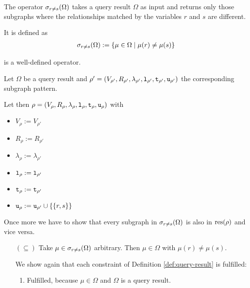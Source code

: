 \begin{definition}
\label{def:distinct}

The  operator $\sigma_{r \not = s}(\Omega)$ takes a query
result $\Omega$ as input and returns only those subgraphs where the
relationships matched by the variables $r$ and $s$ are different.

It is defined as
\begin{align*}
  \sigma_{r \not = s}(\Omega) := \{ \mu \in \Omega \mid \mu(r) \not = \mu(s) \}
\end{align*}

\begin{proofof}{ is a well-defined operator.}
\label{proof:distinct-well-defined}

Let $\Omega$ be a query result and
$\rho' = (V_{\rho'}, R_{\rho'}, \lambda_{\rho'}, \texttt{l}_{\rho'}, \texttt{t}_{\rho'}, \texttt{u}_{\rho'})$
the corresponding subgraph pattern.

Let then $\rho = (V_\rho, R_\rho, \lambda_\rho, \texttt{l}_\rho, \texttt{t}_\rho, \texttt{u}_\rho)$
with
\begin{itemize}[label={}]
  \item $V_\rho := V_{\rho'}$
  \item $R_\rho := R_{\rho'}$
  \item $\lambda_\rho := \lambda_{\rho'}$
  \item $\texttt{l}_\rho := \texttt{l}_{\rho'}$
  \item $\texttt{t}_\rho := \texttt{t}_{\rho'}$
  \item $\texttt{u}_\rho := \texttt{u}_{\rho'} \cup \{ \{ r,s \} \}$
\end{itemize}

Once more we have to show that every subgraph in
$\sigma_{r \not = s}(\Omega)$ is also in $\text{res}(\rho)$ and vice
versa.

\begin{itemize}
  \item[$(\subseteq)$]
    Take $\mu \in \sigma_{r \not = s}(\Omega)$ arbitrary.
    Then $\mu \in \Omega$ with $\mu(r) \not = \mu(s)$.
    
    We show again that each constraint of Definition \ref{def:query-result} is
    fulfilled:
    \begin{enumerate}[(1)]
      \item %
        Fulfilled, because $\mu \in \Omega$ and $\Omega$ is a query result.
        

\end{enumerate}
\end{itemize}
\end{proofof}
\end{definition}
